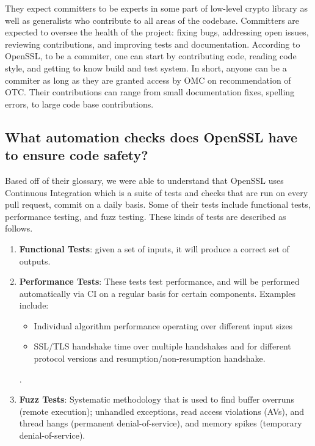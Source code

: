 \documentclass[conference]{IEEEtran}
\begin{document}
They expect committers to be experts in some part of low-level crypto
library as well as generalists who contribute to all areas of the
codebase\cite{7}. Committers are expected to oversee the health of the
project: fixing bugs, addressing open issues, reviewing contributions,
and improving tests and documentation\cite{7}. According to OpenSSL,
to be a commiter, one can start by contributing code, reading code
style, and getting to know build and test system\cite{7}. In short,
anyone can be a commiter as long as they are granted access by OMC on
recommendation of OTC.  Their contributions can range from small
documentation fixes, spelling errors, to large code base
contributions.

\subsection{What automation checks does OpenSSL have to ensure code safety?}

Based off of their glossary, we were able to understand that OpenSSL
uses Continuous Integration which is a suite of tests and checks that
are run on every pull request, commit on a daily basis. Some of their
tests include functional tests, performance testing, and fuzz
testing\cite{9}. These kinds of tests are described as follows.

\begin{enumerate}
\item \textbf{Functional Tests}: given a set of inputs, it
  will produce a correct set of outputs\cite{9}.

\item \textbf{Performance Tests}: These tests test performance, and
  will be performed automatically via CI on a regular basis for
  certain components. Examples include:

  \begin{itemize}
  \item Individual algorithm performance operating over different
    input sizes
  \item SSL/TLS handshake time over multiple handshakes and for
    different protocol versions and resumption/non-resumption
    handshake.
  \end{itemize}\cite{9}.

\item \textbf{Fuzz Tests}: Systematic methodology that is used to find
  buffer overruns (remote execution); unhandled exceptions, read
  access violations (AVs), and thread hangs (permanent
  denial-of-service), and memory spikes (temporary
  denial-of-service)\cite{10}.

\end{enumerate}
\end{document}
